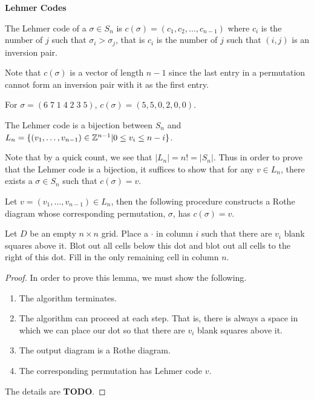 \noindent\textbf{Lehmer Codes}

\begin{definition}
    The Lehmer code of a $\sigma\in S_n$ is $c(\sigma)=(c_1,c_2,\ldots,c_{n-1})$ where $c_i$ is the number of $j$ such
    that $\sigma_i>\sigma_j$, that is $c_i$ is the number of $j$ such that $(i,j)$ is an inversion pair.
\end{definition}

\noindent Note that $c(\sigma)$ is a vector of length $n-1$ since the last entry in a permutation cannot form an
inversion pair with it as the first entry.

\begin{example}
    For $\sigma=(6\;7\;1\;4\;2\;3\;5)$, $c(\sigma)=(5,5,0,2,0,0)$.
\end{example}

\begin{theorem}
    The Lehmer code is a bijection between $S_n$ and $L_n=\{(v_1,\ldots,v_{n-1})\in\mathbb{Z}^{n-1}|0\leq v_i\leq n-i\}$.
\end{theorem}

Note that by a quick count, we see that $|L_n|=n!=|S_n|$. Thus in order to prove that the Lehmer code is a bijection, it
suffices to show that for any $v\in L_n$, there exists a $\sigma\in S_n$ such that $c(\sigma)=v$.

\begin{lemma}
    Let $v=(v_1,\ldots,v_{n-1})\in L_n$, then the following procedure constructs a Rothe diagram whose corresponding
    permutation, $\sigma$, has $c(\sigma)=v$.
    \begin{algorithmic}
        \State Let $D$ be an empty $n\times n$ grid.
            \State Place a $\cdot$ in column $i$ such that there are $v_i$ blank squares above it.
            \State Blot out all cells below this dot and blot out all cells to the right of this dot.
        \EndFor
        \State Fill in the only remaining cell in column $n$.
    \end{algorithmic}
\end{lemma}

\begin{proof}
    In order to prove this lemma, we must show the following.
    \begin{enumerate}
        \item The algorithm terminates.
        \item The algorithm can proceed at each step. That is, there is always a space in which we can place our dot so
        that there are $v_i$ blank squares above it.
        \item The output diagram is a Rothe diagram.
        \item The corresponding permutation has Lehmer code $v$.
    \end{enumerate}

    The details are \textbf{TODO}.
\end{proof}

